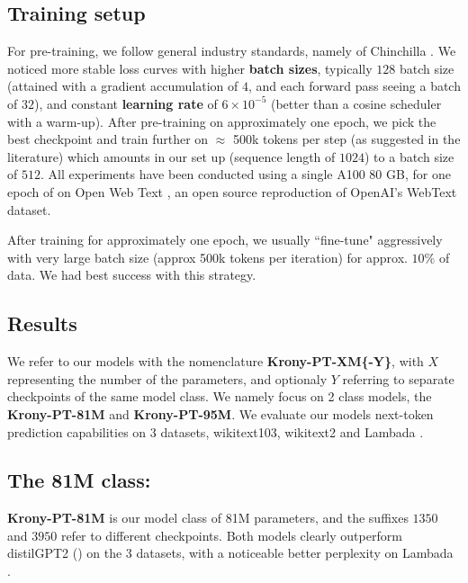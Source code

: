 \documentclass{article}
\begin{document}
{\subsection{Training setup}%
\label{sub:Setup}

For pre-training, we follow general industry standards, namely of Chinchilla \cite{hoffmann2022training}. We noticed more stable loss curves with higher \textbf{batch sizes}, typically $128$ batch size (attained with a gradient accumulation of $4$, and each forward pass seeing a batch of $32$), and constant \textbf{learning rate} of $6 \times 10^{-5}$ (better than a cosine scheduler with a warm-up). After pre-training on approximately one epoch, we pick the best checkpoint and train further on $\approx$ 500k tokens per step (as suggested in the literature) which amounts in our set up (sequence length of $1024$) to a batch size of $512$. All experiments have been conducted using a single A100 80 GB, for one epoch of on Open Web Text \cite{Gokaslan2019OpenWeb}, an open source reproduction of OpenAI's WebText dataset.


After training for approximately one epoch, we usually ``fine-tune" aggressively with very large batch size (approx 500k tokens per iteration) for approx. $10\%$ of data. We had best success with this strategy.


\subsection{Results}%
\label{sub:results}

We refer to our models with the nomenclature \textbf{Krony-PT-XM\{-Y\}}, with $X$ representing the number of the parameters, and optionaly $Y$ referring to separate checkpoints of the same model class. We namely focus on 2 class models, the  \textbf{Krony-PT-81M} and \textbf{Krony-PT-95M}. We evaluate our models next-token prediction capabilities on 3 datasets, wikitext103, wikitext2 \cite{merity2016pointer} and Lambada \cite{paperno2016lambada}. 

\subsection{The 81M class:}%
\label{sub:The 81M class:}

\textbf{Krony-PT-81M} is our model class of 81M parameters, and the suffixes $1350$ and $3950$ refer to different checkpoints. Both models clearly outperform distilGPT2 (\cite{sanh2019distilbert}) on the 3 datasets, with a noticeable better perplexity on Lambada \cite{paperno2016lambada}.


}
\end{document}

